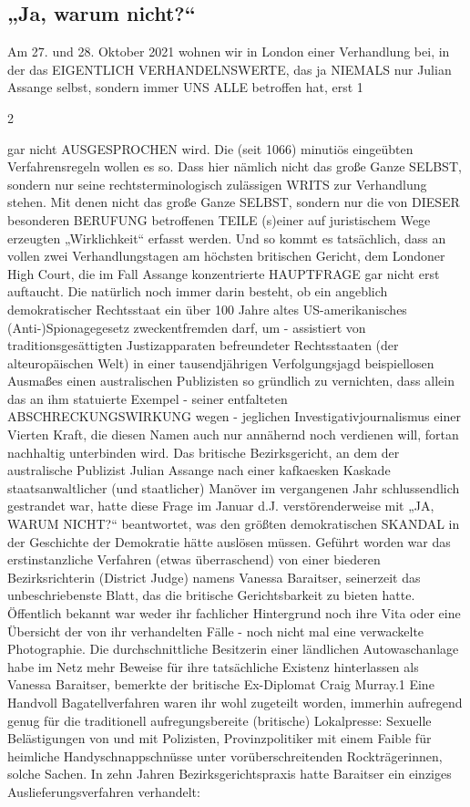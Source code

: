 \begin{multicols}{2}

\chapter{„Ja, warum nicht?“}
Am 27. und 28. Oktober 2021 wohnen wir in London
einer Verhandlung bei, in der das EIGENTLICH VERHANDELNSWERTE, das ja NIEMALS nur Julian Assange selbst, sondern immer UNS ALLE betroffen hat, erst
1

2

gar nicht AUSGESPROCHEN wird. Die (seit 1066) minutiös eingeübten Verfahrensregeln wollen es so. Dass hier
nämlich nicht das große Ganze SELBST, sondern nur seine rechtsterminologisch zulässigen WRITS zur Verhandlung stehen. Mit denen nicht das große Ganze SELBST,
sondern nur die von DIESER besonderen BERUFUNG
betroffenen TEILE (s)einer auf juristischem Wege erzeugten „Wirklichkeit“ erfasst werden.
Und so kommt es tatsächlich, dass an vollen zwei Verhandlungstagen am höchsten britischen Gericht, dem
Londoner High Court, die im Fall Assange konzentrierte HAUPTFRAGE gar nicht erst auftaucht. Die natürlich
noch immer darin besteht, ob ein angeblich demokratischer Rechtsstaat ein über 100 Jahre altes US-amerikanisches (Anti-)Spionagegesetz zweckentfremden darf,
um - assistiert von traditionsgesättigten Justizapparaten
befreundeter Rechtsstaaten (der alteuropäischen Welt) in einer tausendjährigen Verfolgungsjagd beispiellosen
Ausmaßes einen australischen Publizisten so gründlich
zu vernichten, dass allein das an ihm statuierte Exempel - seiner entfalteten ABSCHRECKUNGSWIRKUNG
wegen - jeglichen Investigativjournalismus einer Vierten
Kraft, die diesen Namen auch nur annähernd noch verdienen will, fortan nachhaltig unterbinden wird.
Das britische Bezirksgericht, an dem der australische
Publizist Julian Assange nach einer kafkaesken Kaskade
staatsanwaltlicher (und staatlicher) Manöver im vergangenen Jahr schlussendlich gestrandet war, hatte diese
Frage im Januar d.J. verstörenderweise mit „JA, WARUM
NICHT?“ beantwortet, was den größten demokratischen
SKANDAL in der Geschichte der Demokratie hätte auslösen müssen.
Geführt worden war das erstinstanzliche Verfahren (etwas überraschend) von einer biederen Bezirksrichterin
(District Judge) namens Vanessa Baraitser, seinerzeit das
unbeschriebenste Blatt, das die britische Gerichtsbarkeit
zu bieten hatte. Öffentlich bekannt war weder ihr fachlicher Hintergrund noch ihre Vita oder eine Übersicht
der von ihr verhandelten Fälle - noch nicht mal eine verwackelte Photographie. Die durchschnittliche Besitzerin
einer ländlichen Autowaschanlage habe im Netz mehr
Beweise für ihre tatsächliche Existenz hinterlassen als
Vanessa Baraitser, bemerkte der britische Ex-Diplomat
Craig Murray.1
Eine Handvoll Bagatellverfahren waren ihr wohl zugeteilt worden, immerhin aufregend genug für die traditionell aufregungsbereite (britische) Lokalpresse: Sexuelle
Belästigungen von und mit Polizisten, Provinzpolitiker
mit einem Faible für heimliche Handyschnappschnüsse unter vorüberschreitenden Rockträgerinnen, solche
Sachen. In zehn Jahren Bezirksgerichtspraxis hatte Baraitser ein einziges Auslieferungsverfahren verhandelt:


\end{multicols}
